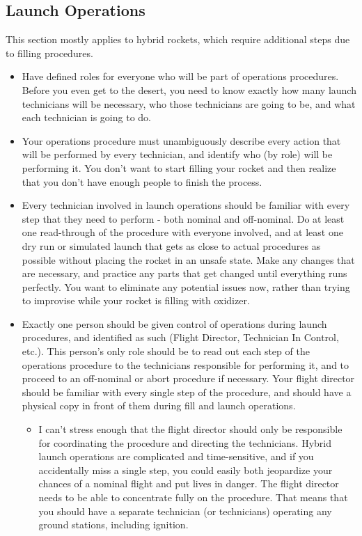\subsection{Launch Operations}
    This section mostly applies to hybrid rockets, which require additional steps due to filling procedures.
    \begin{itemize}
        \item Have defined roles for everyone who will be part of operations procedures. Before you even get to the desert, you need to know exactly how many launch technicians will be necessary, who those technicians are going to be, and what each technician is going to do.
        \item Your operations procedure must unambiguously describe every action that will be performed by every technician, and identify who (by role) will be performing it. You don’t want to start filling your rocket and then realize that you don’t have enough people to finish the process.
        \item Every technician involved in launch operations should be familiar with every step that they need to perform - both nominal and off-nominal. Do at least one read-through of the procedure with everyone involved, and at least one dry run or simulated launch that gets as close to actual procedures as possible without placing the rocket in an unsafe state. Make any changes that are necessary, and practice any parts that get changed until everything runs perfectly. You want to eliminate any potential issues now, rather than trying to improvise while your rocket is filling with oxidizer.
        \item Exactly one person should be given control of operations during launch procedures, and identified as such (Flight Director, Technician In Control, etc.). This person’s only role should be to read out each step of the operations procedure to the technicians responsible for performing it, and to proceed to an off-nominal or abort procedure if necessary. Your flight director should be familiar with every single step of the procedure, and should have a physical copy in front of them during fill and launch operations.
        \begin{itemize}
            \item I can’t stress enough that the flight director should only be responsible for coordinating the procedure and directing the technicians. Hybrid launch operations are complicated and time-sensitive, and if you accidentally miss a single step, you could easily both jeopardize your chances of a nominal flight and put lives in danger. The flight director needs to be able to concentrate fully on the procedure. That means that you should have a separate technician (or technicians) operating any ground stations, including ignition.

\end{itemize}
\end{itemize}

